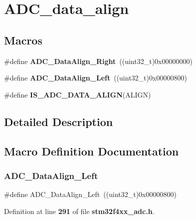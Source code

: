 \section{A\+D\+C\+\_\+data\+\_\+align}
\label{group__ADC__data__align}
\subsection*{Macros}
\begin{DoxyCompactItemize}
\item 
\#define \textbf{ A\+D\+C\+\_\+\+Data\+Align\+\_\+\+Right}~((uint32\+\_\+t)0x00000000)
\item 
\#define \textbf{ A\+D\+C\+\_\+\+Data\+Align\+\_\+\+Left}~((uint32\+\_\+t)0x00000800)
\item 
\#define \textbf{ I\+S\+\_\+\+A\+D\+C\+\_\+\+D\+A\+T\+A\+\_\+\+A\+L\+I\+GN}(A\+L\+I\+GN)
\end{DoxyCompactItemize}


\subsection{Detailed Description}


\subsection{Macro Definition Documentation}
\mbox{\label{group__ADC__data__align_ga87c2b7021bc288174d5d6175dc267251}} 
\subsubsection{A\+D\+C\+\_\+\+Data\+Align\+\_\+\+Left}
{\footnotesize\ttfamily \#define A\+D\+C\+\_\+\+Data\+Align\+\_\+\+Left~((uint32\+\_\+t)0x00000800)}



Definition at line \textbf{ 291} of file \textbf{ stm32f4xx\+\_\+adc.\+h}.

\mbox{\label{group__ADC__data__align_ga80b5d2f2b6b058bc498f58e0a92ad035}} 
